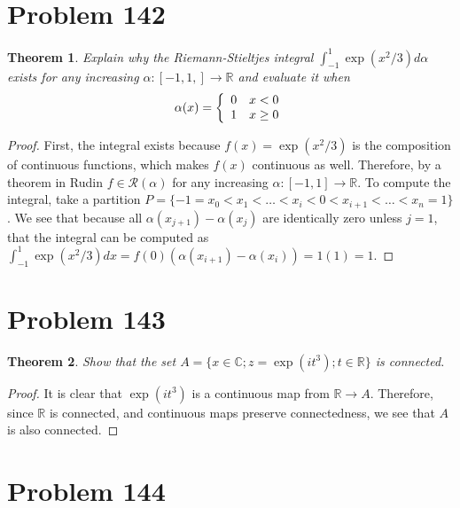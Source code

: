\documentclass[psamsfonts]{amsart}
\newtheorem{thm}{Theorem}[section]
\theoremstyle{definition}
\theoremstyle{remark}
\numberwithin{equation}{section}
\begin{document}
\section{Problem 142}

\begin{thm}
Explain why the Riemann-Stieltjes integral $\int_{-1}^1 \exp(x^2/3) d \alpha$ exists for any increasing $\alpha: [-1,1,] \to \mathbb{R}$ and evaluate it when
\begin{eqnarray}
\alpha(x) = \left\{ \begin{array}{l l}
0 & x < 0 \\
1 & x \geq 0 
\end{array} \right.
\end{eqnarray}
\end{thm}

\begin{proof}
First, the integral exists because $f(x) = \exp(x^2/3)$ is the composition of continuous functions, which makes $f(x)$ continuous as well. Therefore, by a theorem in Rudin $f \in \mathscr{R} (\alpha)$ for any increasing $\alpha: [-1,1] \to \mathbb{R}$. To compute the integral, take a partition $P = \{ -1 = x_0 < x_1 < \ldots < x_i < 0 < x_{i+1} < \ldots < x_n = 1 \}$. We see that because all $\alpha(x_{j+1}) - \alpha(x_{j})$ are identically zero unless $j =1$, that the integral can be computed as $\int_{-1}^1 \exp(x^2/3) dx = f(0) (\alpha(x_{i+1}) - \alpha(x_i)) = 1 (1) = 1$.
\end{proof}

\section{Problem 143}

\begin{thm}
Show that the set $A = \{ x \in \mathbb{C}; z = \exp(it^3); t \in \mathbb{R} \}$ is connected.
\end{thm}

\begin{proof}
It is clear that $\exp(it^3)$ is a continuous map from $\mathbb{R} \to A$. Therefore, since $\mathbb{R}$ is connected, and continuous maps preserve connectedness, we see that $A$ is also connected.
\end{proof}

\section{Problem 144}
\end{document}
